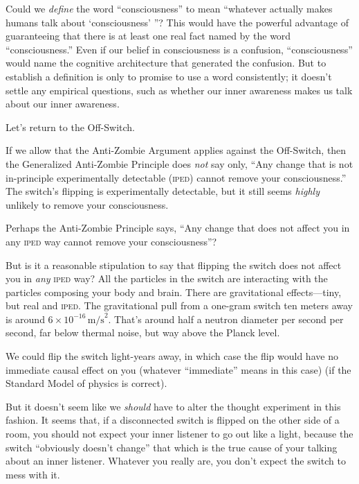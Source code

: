 {
 Could we \textit{define} the word
``consciousness'' to mean
``whatever actually makes humans talk about
`consciousness' ''?
This would have the powerful advantage of guaranteeing that there is at
least one real fact named by the word
``consciousness.'' Even if our
belief in consciousness is a confusion,
``consciousness'' would name the
cognitive architecture that generated the confusion. But to establish a
definition is only to promise to use a word consistently; it
doesn't settle any empirical questions, such as whether
our inner awareness makes us talk about our inner awareness.}

{
 Let's return to the Off-Switch.}

{
 If we allow that the Anti-Zombie Argument applies against the
Off-Switch, then the Generalized Anti-Zombie Principle does
\textit{not} say only, ``Any change that is not
in-principle experimentally detectable (\textsc{iped}) cannot remove your
consciousness.'' The switch's
flipping is experimentally detectable, but it still seems
\textit{highly} unlikely to remove your consciousness.}

{
 Perhaps the Anti-Zombie Principle says, ``Any
change that does not affect you in any \textsc{iped} way cannot remove your
consciousness''?}

{
 But is it a reasonable stipulation to say that flipping the switch
does not affect you in \textit{any} \textsc{iped} way? All the particles in the
switch are interacting with the particles composing your body and
brain. There are gravitational effects---tiny, but real and \textsc{iped}. The
gravitational pull from a one-gram switch ten meters away is around $6 \times
 10^{-16}\, \mathrm{m/s}^2$.
That's around half a neutron diameter per second per
second, far below thermal noise, but way above the Planck level.}

{
 We could flip the switch light-years away, in which case the flip
would have no immediate causal effect on you (whatever
``immediate'' means in this case)
(if the Standard Model of physics is correct).}

{
 But it doesn't seem like we \textit{should} have
to alter the thought experiment in this fashion. It seems that, if a
disconnected switch is flipped on the other side of a room, you should
not expect your inner listener to go out like a light, because the
switch ``obviously doesn't
change'' that which is the true cause of your talking
about an inner listener. Whatever you really are, you
don't expect the switch to mess with it.}


